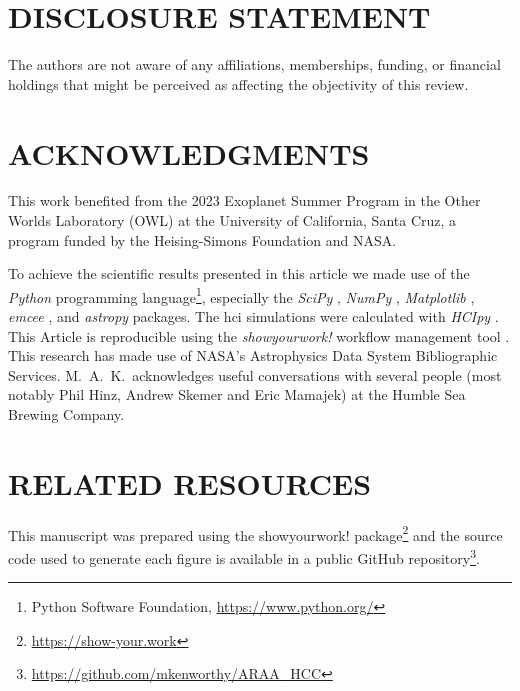 \documentclass[letterpaper]{ar-1col}
\newcommand{\project}[1]{\textsf{#1}}
\begin{document}
\section*{DISCLOSURE STATEMENT}
The authors are not aware of any affiliations, memberships, funding, or financial holdings that might be perceived as affecting the objectivity of this review.

\section*{ACKNOWLEDGMENTS}
This work benefited from the 2023 Exoplanet Summer Program in the Other Worlds Laboratory (OWL) at the University of California, Santa Cruz, a program funded by the Heising-Simons Foundation and NASA.

To achieve the scientific results presented in this article we made use of the \emph{Python} programming language\footnote{Python Software Foundation, \url{https://www.python.org/}}, especially the \emph{SciPy} \citep{virtanen2020}, \emph{NumPy} \citep{numpy}, \emph{Matplotlib} \citep{Matplotlib}, \emph{emcee} \citep{foreman-mackey2013}, and \emph{astropy} \citep{astropy_1,astropy_2} packages.
%
The \ac{hci} simulations were calculated with \emph{HCIpy} \citep{Por18}.
%
This Article is reproducible using the \emph{showyourwork!} workflow management tool \citep{Luger2021}.
%
This research has made use of NASA's Astrophysics Data System Bibliographic Services.
%
M.\ A.\ K.\ acknowledges useful conversations with several people (most notably
Phil Hinz, Andrew Skemer and Eric Mamajek) at the Humble Sea Brewing Company.





\section*{RELATED RESOURCES}

This manuscript was prepared using the \project{showyourwork!} package\footnote{\url{https://show-your.work}} and the source code used to generate each figure is available in a public \project{GitHub} repository\footnote{\url{https://github.com/mkenworthy/ARAA_HCC}}.
\end{document}
